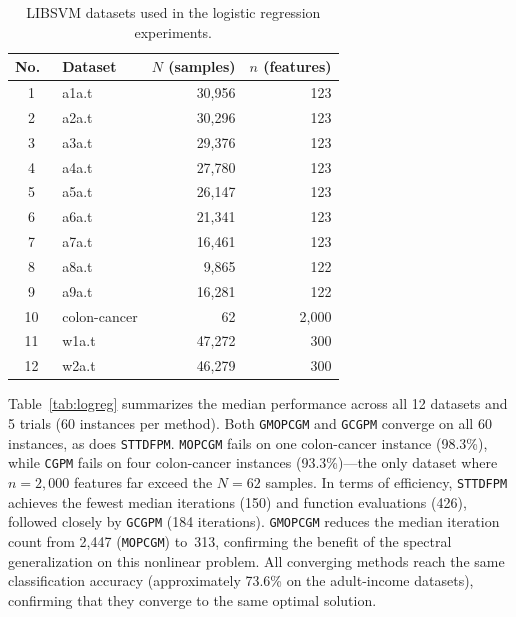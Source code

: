 \documentclass{article}
\theoremstyle{plain}
\theoremstyle{definition}
\theoremstyle{remark}
\newcommand{\algoname}[1]{{\small\texttt{#1}}}
\newcommand{\GMOPCGM}{\algoname{GMOPCGM}}
\newcommand{\GCGPM}{\algoname{GCGPM}}
\newcommand{\MOPCGM}{\algoname{MOPCGM}}
\newcommand{\CGPM}{\algoname{CGPM}}
\newcommand{\STTDFPM}{\algoname{STTDFPM}}
\begin{document}
\begin{table}[htbp]
\centering
\caption{LIBSVM datasets used in the logistic regression experiments.}\label{tab:libsvm_datasets}
\begin{tabular}{clrr}
\toprule
No.\ & Dataset & $N$ (samples) & $n$ (features) \\
\midrule
1  & a1a.t        & 30,956 & 123   \\
2  & a2a.t        & 30,296 & 123   \\
3  & a3a.t        & 29,376 & 123   \\
4  & a4a.t        & 27,780 & 123   \\
5  & a5a.t        & 26,147 & 123   \\
6  & a6a.t        & 21,341 & 123   \\
7  & a7a.t        & 16,461 & 123   \\
8  & a8a.t        & 9,865  & 122   \\
9  & a9a.t        & 16,281 & 122   \\
10 & colon-cancer & 62     & 2,000 \\
11 & w1a.t        & 47,272 & 300   \\
12 & w2a.t        & 46,279 & 300   \\
\bottomrule
\end{tabular}
\end{table}

Table~\ref{tab:logreg} summarizes the median performance across all 12 datasets and 5 trials (60 instances per method). Both \GMOPCGM{} and \GCGPM{} converge on all 60 instances, as does \STTDFPM. \MOPCGM{} fails on one colon-cancer instance (98.3\%), while \CGPM{} fails on four colon-cancer instances (93.3\%)---the only dataset where $n = 2{,}000$ features far exceed the $N = 62$ samples. In terms of efficiency, \STTDFPM{} achieves the fewest median iterations (150) and function evaluations (426), followed closely by \GCGPM{} (184 iterations). \GMOPCGM{} reduces the median iteration count from 2{,}447 (\MOPCGM) to~313, confirming the benefit of the spectral generalization on this nonlinear problem. All converging methods reach the same classification accuracy (approximately 73.6\% on the adult-income datasets), confirming that they converge to the same optimal solution.
\end{document}
